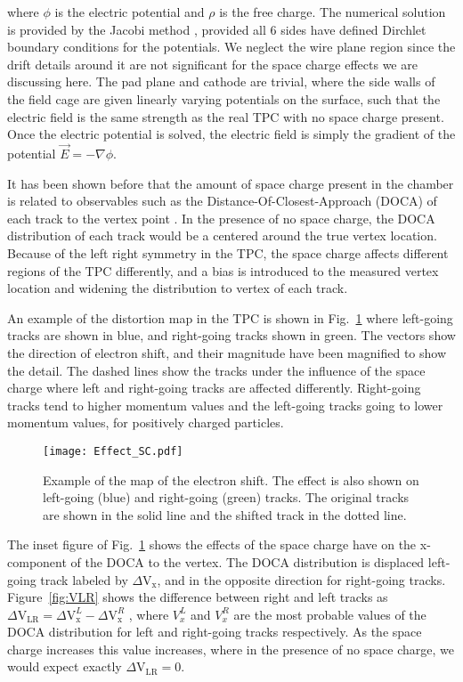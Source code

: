  where $\phi$ is the electric potential and $\rho$ is the free charge. The numerical solution is provided by the Jacobi method \cite{poisson}, provided all 6 sides have defined Dirchlet boundary conditions for the potentials. We neglect the wire plane region since the drift details around it are not significant for the space charge effects we are discussing here. The pad plane and cathode are trivial, where the side walls of the field cage are given linearly varying potentials on the surface, such that the electric field is the same strength as the real TPC with no space charge present. Once the electric potential is solved, the electric field is simply the gradient of the potential  $\vec{E}= -\nabla \phi$. 
 
It has been shown before that the amount of space charge present in the chamber is related to observables such as the Distance-Of-Closest-Approach (DOCA) of each track to the vertex point \cite{starSC}. In the presence of no space charge, the DOCA distribution of each track would be a centered around the true vertex location. Because of the left right symmetry in the TPC, the space charge affects different regions of the TPC differently, and a bias is introduced to the measured vertex location and widening the distribution to vertex of each track.  

An example of the distortion map in the TPC is shown in Fig.~\ref{fig:sc_shift} where left-going tracks are shown in blue, and right-going tracks shown in green. The vectors show the direction of electron shift, and their magnitude have been magnified to show the detail. The dashed lines show the tracks under the influence of the space charge where left and right-going tracks are affected differently. Right-going tracks tend to higher momentum values and the left-going tracks going to lower momentum values, for positively charged particles.  
 

\begin{figure}[!htb]
\centering
\texttt{[image: Effect\_SC.pdf]}
\caption{Example of the map of the electron shift. The effect is also shown on left-going (blue) and right-going (green) tracks. The original tracks are shown in the solid line and the shifted track in the dotted line.}
\label{fig:sc_shift}
\end{figure}

The inset figure of Fig.~\ref{fig:sc_shift} shows the effects of the space charge have on the x-component of the DOCA to the vertex. The DOCA distribution is displaced left-going track labeled by $\Delta\mathrm{V}_\mathrm{x}$, and in the opposite direction for right-going tracks. Figure~\ref{fig:VLR} shows the difference between right and left tracks as $\Delta\mathrm{V}_\mathrm{LR} = \Delta\mathrm{V}_\mathrm{x}^L - \Delta\mathrm{V}_\mathrm{x}^R$ , where  $V_x^L$ and $V_x^R$ are the most probable values of the DOCA distribution for left and right-going tracks respectively. As the space charge increases this value increases, where in the presence of no space charge, we would expect exactly $\Delta\mathrm{V}_\mathrm{LR} = 0$. 

